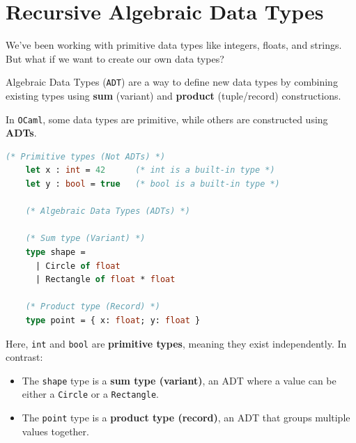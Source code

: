 \section{Recursive Algebraic Data Types}
\noindent
We've been working with primitive data types like integers, floats, and strings. But what if we want to create our own data types?

\begin{Def}

    Algebraic Data Types (\texttt{ADT}) are a way to define new data types by combining existing types using \textbf{sum} (variant) and \textbf{product} (tuple/record) constructions.
\end{Def}

\begin{Example}

    In \texttt{OCaml}, some data types are primitive, while others are constructed using \textbf{ADTs}.

    \begin{lstlisting}[language=OCaml, caption={Primitive Types vs. ADTs}, numbers=none]
    (* Primitive types (Not ADTs) *)
    let x : int = 42      (* int is a built-in type *)
    let y : bool = true   (* bool is a built-in type *)

    (* Algebraic Data Types (ADTs) *)

    (* Sum type (Variant) *)
    type shape =
      | Circle of float
      | Rectangle of float * float
    
    (* Product type (Record) *)
    type point = { x: float; y: float }
    \end{lstlisting}

    \noindent
    Here, \texttt{int} and \texttt{bool} are \textbf{primitive types}, meaning they exist independently. In contrast:
    \begin{itemize}
        \item The \texttt{shape} type is a \textbf{sum type (variant)}, an ADT where a value can be either a \texttt{Circle} or a \texttt{Rectangle}.
        \item The \texttt{point} type is a \textbf{product type (record)}, an ADT that groups multiple values together.
    \end{itemize}
\end{Example}

\newpage 

